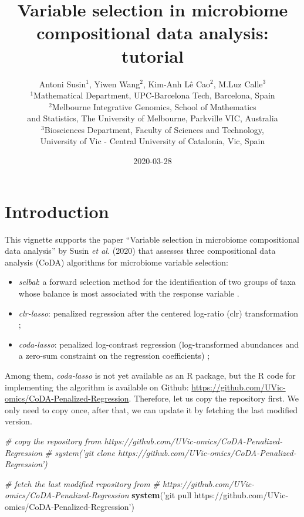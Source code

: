 \documentclass[openany]{book}
\title{Variable selection in microbiome compositional data analysis: tutorial}
\author{Antoni Susin\(^1\), Yiwen Wang\(^2\), Kim-Anh Lê Cao\(^2\), M.Luz
Calle\(^3\)\\[2\baselineskip]\(^1\)Mathematical Department,
UPC-Barcelona Tech, Barcelona, Spain\\
\(^2\)Melbourne Integrative Genomics, School of Mathematics\\
and Statistics, The University of Melbourne, Parkville VIC, Australia\\
\(^3\)Biosciences Department, Faculty of Sciences and Technology,\\
University of Vic - Central University of Catalonia, Vic, Spain}
\date{2020-03-28}
\newenvironment{Shaded}{\begin{snugshade}}{\end{snugshade}}
\newcommand{\KeywordTok}[1]{\textcolor[rgb]{0.13,0.29,0.53}{\textbf{#1}}}
\newcommand{\StringTok}[1]{\textcolor[rgb]{0.31,0.60,0.02}{#1}}
\newcommand{\CommentTok}[1]{\textcolor[rgb]{0.56,0.35,0.01}{\textit{#1}}}
\newcommand{\NormalTok}[1]{#1}
\providecommand{\tightlist}{%
  \setlength{\itemsep}{0pt}\setlength{\parskip}{0pt}}
\begin{document}
\maketitle

{
\hypersetup{linkcolor=black}
\setcounter{tocdepth}{3}
\tableofcontents
}
\chapter{Introduction}\label{introduction}

This vignette supports the paper ``Variable selection in microbiome
compositional data analysis'' by Susin \emph{et al.} (2020) that
assesses three compositional data analysis (CoDA) algorithms for
microbiome variable selection:

\begin{itemize}
\tightlist
\item
  \emph{selbal}: a forward selection method for the identification of
  two groups of taxa whose balance is most associated with the response
  variable \citep{rivera2018balances}.
\item
  \emph{clr-lasso}: penalized regression after the centered log-ratio
  (clr) transformation
  \citep{zou2005regularization, tibshirani1996regression, le1992ridge};
\item
  \emph{coda-lasso}: penalized log-contrast regression (log-transformed
  abundances and a zero-sum constraint on the regression coefficients)
  \citep{lu2019generalized, lin2014variable};
\end{itemize}

Among them, \emph{coda-lasso} is not yet available as an R package, but
the R code for implementing the algorithm is available on Github:
\url{https://github.com/UVic-omics/CoDA-Penalized-Regression}.
Therefore, let us copy the repository first. We only need to copy once,
after that, we can update it by fetching the last modified version.

\begin{Shaded}
\begin{Highlighting}[]
\CommentTok{# copy the repository from https://github.com/UVic-omics/CoDA-Penalized-Regression}
\CommentTok{# system('git clone https://github.com/UVic-omics/CoDA-Penalized-Regression')}

\CommentTok{# fetch the last modified repository from }
\CommentTok{# https://github.com/UVic-omics/CoDA-Penalized-Regression}
\KeywordTok{system}\NormalTok{(}\StringTok{'git pull https://github.com/UVic-omics/CoDA-Penalized-Regression'}\NormalTok{)}
\end{Highlighting}
\end{Shaded}
\end{document}

